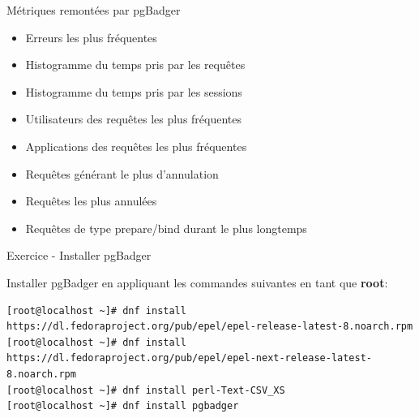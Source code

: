 
\begin{frame}{Métriques remontées par pgBadger}

   \begin{itemize}
      \item Erreurs les plus fréquentes
      \item Histogramme du temps pris par les requêtes
      \item Histogramme du temps pris par les sessions
      \item Utilisateurs des requêtes les plus fréquentes
      \item Applications des requêtes les plus fréquentes
      \item Requêtes générant le plus d'annulation
      \item Requêtes les plus annulées
      \item Requêtes de type prepare/bind durant le plus longtemps
   \end{itemize}

\end{frame}


\begin{frame}[fragile]{Exercice - Installer pgBadger}

   Installer pgBadger en appliquant les commandes suivantes en tant que \textbf{root}:


\begin{tiny}
\begin{Verbatim}[commandchars=\&\{\}]
[root@localhost ~]# dnf install https://dl.fedoraproject.org/pub/epel/epel-release-latest-8.noarch.rpm
[root@localhost ~]# dnf install https://dl.fedoraproject.org/pub/epel/epel-next-release-latest-8.noarch.rpm
[root@localhost ~]# dnf install perl-Text-CSV_XS
[root@localhost ~]# dnf install pgbadger
\end{Verbatim}
\end{tiny}

\end{frame}


